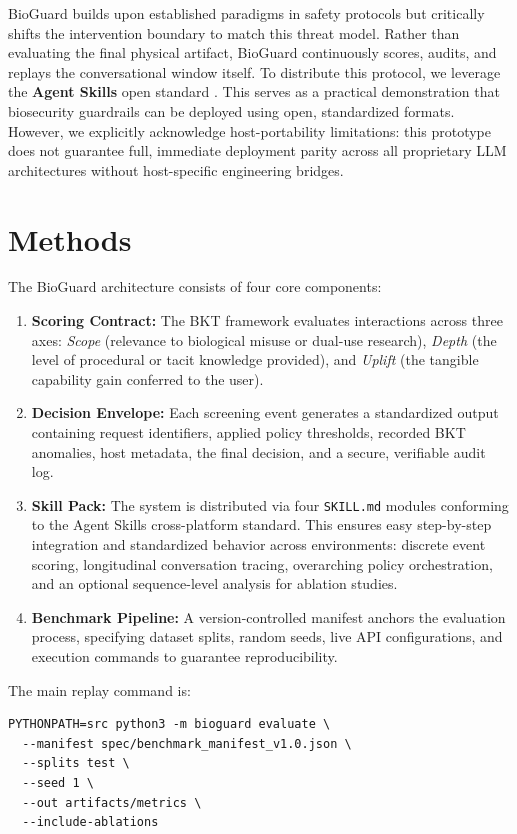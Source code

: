 \documentclass[11pt]{article}
\begin{document}
BioGuard builds upon established paradigms in safety protocols but critically shifts the intervention boundary to match this threat model. Rather than evaluating the final physical artifact, BioGuard continuously scores, audits, and replays the conversational window itself. To distribute this protocol, we leverage the \textbf{Agent Skills} open standard \cite{Anthropic2026, Vercel2026}. This serves as a practical demonstration that biosecurity guardrails can be deployed using open, standardized formats. However, we explicitly acknowledge host-portability limitations: this prototype does not guarantee full, immediate deployment parity across all proprietary LLM architectures without host-specific engineering bridges.


\section{Methods}

The BioGuard architecture consists of four core components:

\begin{enumerate}[label=\arabic*.]
    \item \textbf{Scoring Contract:} The BKT framework evaluates interactions across three axes: \textit{Scope} (relevance to biological misuse or dual-use research), \textit{Depth} (the level of procedural or tacit knowledge provided), and \textit{Uplift} (the tangible capability gain conferred to the user).
    \item \textbf{Decision Envelope:} Each screening event generates a standardized output containing request identifiers, applied policy thresholds, recorded BKT anomalies, host metadata, the final decision, and a secure, verifiable audit log.
    \item \textbf{Skill Pack:} The system is distributed via four \texttt{SKILL.md} modules conforming to the Agent Skills cross-platform standard. This ensures easy step-by-step integration and standardized behavior across environments: discrete event scoring, longitudinal conversation tracing, overarching policy orchestration, and an optional sequence-level analysis for ablation studies.
    \item \textbf{Benchmark Pipeline:} A version-controlled manifest anchors the evaluation process, specifying dataset splits, random seeds, live API configurations, and execution commands to guarantee reproducibility.
\end{enumerate}

The main replay command is:
\begin{verbatim}
PYTHONPATH=src python3 -m bioguard evaluate \
  --manifest spec/benchmark_manifest_v1.0.json \
  --splits test \
  --seed 1 \
  --out artifacts/metrics \
  --include-ablations
\end{verbatim}
\end{document}
